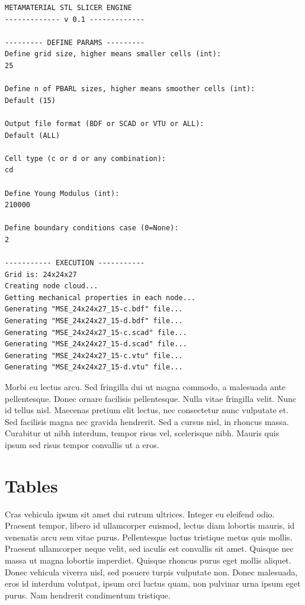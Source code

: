 \begin{mdframed}[backgroundcolor=black,leftmargin=0.5cm,hidealllines=true,%
  innerleftmargin=0.2cm,innerrightmargin=0.2cm,innertopmargin=-0.1cm,innerbottommargin=-0.85cm]

\begin{lstlisting}[language=DOS, caption={MSE runtime example}]
  METAMATERIAL STL SLICER ENGINE
------------- v 0.1 -------------

--------- DEFINE PARAMS ---------
Define grid size, higher means smaller cells (int):
25

Define n of PBARL sizes, higher means smoother cells (int):
Default (15)

Output file format (BDF or SCAD or VTU or ALL):
Default (ALL)

Cell type (c or d or any combination):
cd

Define Young Modulus (int):
210000

Define boundary conditions case (0=None):
2

----------- EXECUTION -----------
Grid is: 24x24x27
Creating node cloud...
Getting mechanical properties in each node...
Generating "MSE_24x24x27_15-c.bdf" file...
Generating "MSE_24x24x27_15-d.bdf" file...
Generating "MSE_24x24x27_15-c.scad" file...
Generating "MSE_24x24x27_15-d.scad" file...
Generating "MSE_24x24x27_15-c.vtu" file...
Generating "MSE_24x24x27_15-d.vtu" file...

\end{lstlisting}
\end{mdframed}


Morbi eu lectus arcu. Sed fringilla dui ut magna commodo, a malesuada ante pellentesque. Donec ornare facilisis pellentesque. Nulla vitae fringilla velit. Nunc id tellus nisl. Maecenas pretium elit lectus, nec consectetur nunc vulputate et. Sed facilisis magna nec gravida hendrerit. Sed a cursus nisl, in rhoncus massa. Curabitur ut nibh interdum, tempor risus vel, scelerisque nibh. Mauris quis ipsum sed risus tempor convallis ut a eros.

\section{Tables}

Cras vehicula ipsum sit amet dui rutrum ultrices. Integer eu eleifend odio. Praesent tempor, libero id ullamcorper euismod, lectus diam lobortis mauris, id venenatis arcu sem vitae purus. Pellentesque luctus tristique metus quis mollis. Praesent ullamcorper neque velit, sed iaculis est convallis sit amet. Quisque nec massa ut magna lobortis imperdiet. Quisque rhoncus purus eget mollis aliquet. Donec vehicula viverra nisl, sed posuere turpis vulputate non. Donec malesuada, eros id interdum volutpat, ipsum orci luctus quam, non pulvinar urna ipsum eget purus. Nam hendrerit condimentum tristique.

